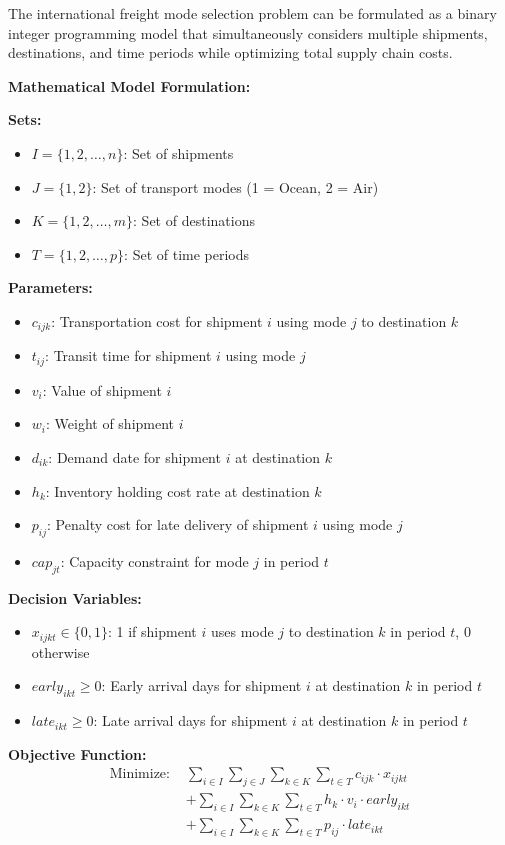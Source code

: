 \documentclass{article}
\begin{document}
The international freight mode selection problem can be formulated as a binary integer programming model that simultaneously considers multiple shipments, destinations, and time periods while optimizing total supply chain costs.

\textbf{Mathematical Model Formulation:}

\textbf{Sets:}
\begin{itemize}
\item $I = \{1, 2, \ldots, n\}$: Set of shipments
\item $J = \{1, 2\}$: Set of transport modes (1 = Ocean, 2 = Air)
\item $K = \{1, 2, \ldots, m\}$: Set of destinations
\item $T = \{1, 2, \ldots, p\}$: Set of time periods
\end{itemize}

\textbf{Parameters:}
\begin{itemize}
\item $c_{ijk}$: Transportation cost for shipment $i$ using mode $j$ to destination $k$
\item $t_{ij}$: Transit time for shipment $i$ using mode $j$
\item $v_i$: Value of shipment $i$
\item $w_i$: Weight of shipment $i$
\item $d_{ik}$: Demand date for shipment $i$ at destination $k$
\item $h_k$: Inventory holding cost rate at destination $k$
\item $p_{ij}$: Penalty cost for late delivery of shipment $i$ using mode $j$
\item $cap_{jt}$: Capacity constraint for mode $j$ in period $t$
\end{itemize}

\textbf{Decision Variables:}
\begin{itemize}
\item $x_{ijkt} \in \{0, 1\}$: 1 if shipment $i$ uses mode $j$ to destination $k$ in period $t$, 0 otherwise
\item $early_{ikt} \geq 0$: Early arrival days for shipment $i$ at destination $k$ in period $t$
\item $late_{ikt} \geq 0$: Late arrival days for shipment $i$ at destination $k$ in period $t$
\end{itemize}

\textbf{Objective Function:}
\begin{align}
\text{Minimize: } & \sum_{i \in I} \sum_{j \in J} \sum_{k \in K} \sum_{t \in T} c_{ijk} \cdot x_{ijkt} \\
& + \sum_{i \in I} \sum_{k \in K} \sum_{t \in T} h_k \cdot v_i \cdot early_{ikt} \\
& + \sum_{i \in I} \sum_{k \in K} \sum_{t \in T} p_{ij} \cdot late_{ikt}
\end{align}
\end{document}
